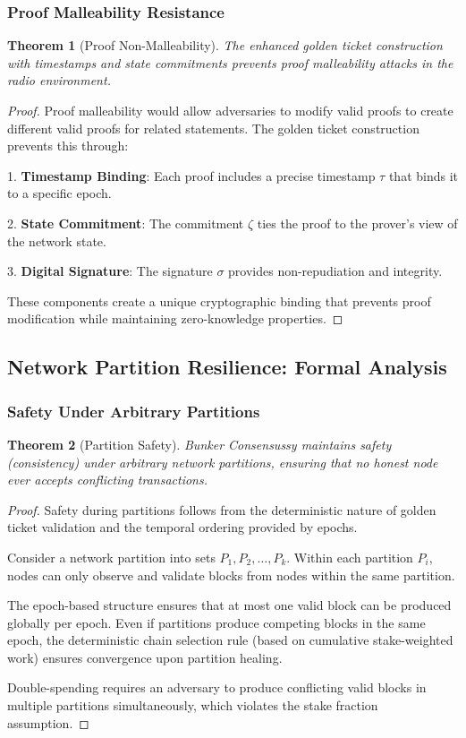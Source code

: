 \documentclass[11pt,a4paper]{article}
\newtheorem{theorem}{Theorem}[section]
\begin{document}
\subsubsection{Proof Malleability Resistance}

\begin{theorem}[Proof Non-Malleability]
The enhanced golden ticket construction with timestamps and state commitments prevents proof malleability attacks in the radio environment.
\end{theorem}

\begin{proof}
Proof malleability would allow adversaries to modify valid proofs to create different valid proofs for related statements. The golden ticket construction prevents this through:

1. \textbf{Timestamp Binding}: Each proof includes a precise timestamp $\tau$ that binds it to a specific epoch.

2. \textbf{State Commitment}: The commitment $\zeta$ ties the proof to the prover's view of the network state.

3. \textbf{Digital Signature}: The signature $\sigma$ provides non-repudiation and integrity.

These components create a unique cryptographic binding that prevents proof modification while maintaining zero-knowledge properties.
\end{proof}

\subsection{Network Partition Resilience: Formal Analysis}

\subsubsection{Safety Under Arbitrary Partitions}

\begin{theorem}[Partition Safety]
Bunker Consensussy maintains safety (consistency) under arbitrary network partitions, ensuring that no honest node ever accepts conflicting transactions.
\end{theorem}

\begin{proof}
Safety during partitions follows from the deterministic nature of golden ticket validation and the temporal ordering provided by epochs.

Consider a network partition into sets $P_1, P_2, \ldots, P_k$. Within each partition $P_i$, nodes can only observe and validate blocks from nodes within the same partition.

The epoch-based structure ensures that at most one valid block can be produced globally per epoch. Even if partitions produce competing blocks in the same epoch, the deterministic chain selection rule (based on cumulative stake-weighted work) ensures convergence upon partition healing.

Double-spending requires an adversary to produce conflicting valid blocks in multiple partitions simultaneously, which violates the stake fraction assumption.
\end{proof}
\end{document}
